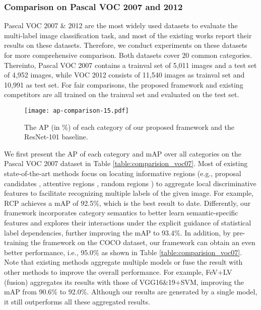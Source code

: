 \documentclass[10pt,twocolumn,letterpaper]{article}
\begin{document}
\subsubsection{Comparison on Pascal VOC 2007 and 2012}
Pascal VOC 2007 \& 2012 \cite{everingham2010pascal} are the most widely used datasets to evaluate the multi-label image classification task, and most of the existing works report their results on these datasets. Therefore, we conduct experiments on these datasets for more comprehensive comparison. Both datasets cover 20 common categories. Thereinto, Pascal VOC 2007 contains a trainval set of 5,011 images and a test set of 4,952 images, while VOC 2012 consists of 11,540 images as trainval set and 10,991 as test set. For fair comparisons, the proposed framework and existing competitors are all trained on the trainval set and evaluated on the test set.

\begin{figure*}[!t]
   \centering
   \texttt{[image: ap-comparison-15.pdf]} \caption{The AP (in \%) of each category of our proposed framework and the ResNet-101 baseline.}
   \label{fig:ap-comparison}
\end{figure*}

We first present the AP of each category and mAP over all categories on the Pascal VOC 2007 dataset in Table \ref{table:comparision_voc07}. Most of existing state-of-the-art methods focus on locating informative regions (e.g., proposal candidates \cite{yang2016exploit,wei2016hcp,zhang2018multi}, attentive regions \cite{wang2017multi}, random regions \cite{wang2016beyond}) to aggregate local discriminative features to facilitate recognizing multiple labels of the given image. For example, RCP achieves a mAP of 92.5\%, which is the best result to date. Differently, our framework incorporates category semantics to better learn semantic-specific features and explores their interactions under the explicit guidance of statistical label dependencies, further improving the mAP to 93.4\%. In addition, by pre-training the framework on the COCO dataset, our framework can obtain an even better performance, i.e., 95.0\% as shown in Table \ref{table:comparision_voc07}. Note that existing methods aggregate multiple models \cite{simonyan2014very} or fuse the result with other methods \cite{yang2016exploit} to improve the overall performance. For example, FeV+LV (fusion) aggregates its results with those of VGG16\&19+SVM, improving the mAP from 90.6\% to 92.0\%. Although our results are generated by a single model, it still outperforms all these aggregated results.
\end{document}
